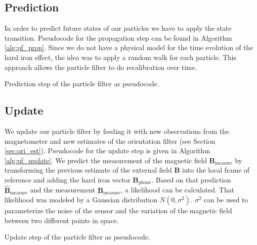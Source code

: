 \subsection{Prediction}

In order to predict future states of our particles we have to apply the state transition. Pseudocode for the propagation step can be found in Algorithm \ref{alg:pf_prop}. Since we do not have a physical model for the time evolution of the hard iron effect, the idea was to apply a random walk for each particle. This approach allows the particle filter to do recalibration over time.

\begin{algorithm}[h]
	\caption{Prediction step of the particle filter as pseudocode.}
	\label{alg:pf_prop}
\end{algorithm}

\subsection{Update}

We update our particle filter by feeding it with new observations from the magnetometer and new estimates of the orientation filter (see Section \ref{sec:ori_est}). Pseudocode for the update step is given in Algorithm \ref{alg:pf_update}. We predict the measurement of the magnetic field $\bm{B}_\text{measure}$ by transforming the previous estimate of the external field $\bm{B}$ into the local frame of reference and adding the hard iron vector $\bm{B}_\text{phone}$. Based on that prediction $\hat{\bm{B}}_\text{measure}$ and the measurement $\bm{B}_\text{measure}$, a likelihood can be calculated. That likelihood was modeled by a Gaussian distribution $N(0, \sigma^2)$. $\sigma^2$ can be used to parameterize the noise of the sensor and the variation of the magnetic field between two different points in space.

\begin{algorithm}[hbt!]
	\caption{Update step of the particle filter as pseudocode.}
	\label{alg:pf_update}
\end{algorithm}

